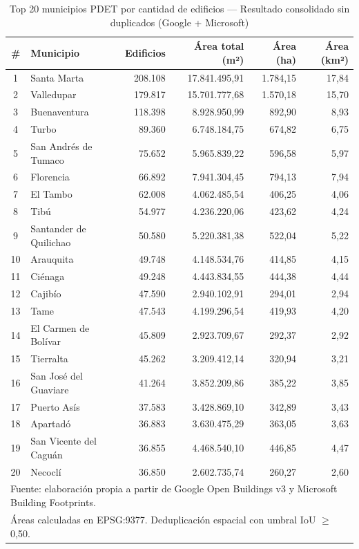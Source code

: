 \documentclass{article}
\begin{document}
\begin{table}[H]
\centering
\caption{Top 20 municipios PDET por cantidad de edificios --- Resultado consolidado 
sin duplicados (Google + Microsoft)}
\label{tab:top20_edificios}
\small
\begin{tabular}{clrrrr}
\toprule
\textbf{\#} & \textbf{Municipio} & \textbf{Edificios} & \textbf{Área total (m²)} & 
\textbf{Área (ha)} & \textbf{Área (km²)} \\
\midrule
1  & Santa Marta            & 208.108 & 17.841.495,91 & 1.784,15 & 17,84 \\
2  & Valledupar             & 179.817 & 15.701.777,68 & 1.570,18 & 15,70 \\
3  & Buenaventura           & 118.398 &  8.928.950,99 &   892,90 &  8,93 \\
4  & Turbo                  &  89.360 &  6.748.184,75 &   674,82 &  6,75 \\
5  & San Andrés de Tumaco   &  75.652 &  5.965.839,22 &   596,58 &  5,97 \\
6  & Florencia              &  66.892 &  7.941.304,45 &   794,13 &  7,94 \\
7  & El Tambo               &  62.008 &  4.062.485,54 &   406,25 &  4,06 \\
8  & Tibú                   &  54.977 &  4.236.220,06 &   423,62 &  4,24 \\
9  & Santander de Quilichao &  50.580 &  5.220.381,38 &   522,04 &  5,22 \\
10 & Arauquita              &  49.748 &  4.148.534,76 &   414,85 &  4,15 \\
11 & Ciénaga                &  49.248 &  4.443.834,55 &   444,38 &  4,44 \\
12 & Cajibío                &  47.590 &  2.940.102,91 &   294,01 &  2,94 \\
13 & Tame                   &  47.543 &  4.199.296,54 &   419,93 &  4,20 \\
14 & El Carmen de Bolívar   &  45.809 &  2.923.709,67 &   292,37 &  2,92 \\
15 & Tierralta              &  45.262 &  3.209.412,14 &   320,94 &  3,21 \\
16 & San José del Guaviare  &  41.264 &  3.852.209,86 &   385,22 &  3,85 \\
17 & Puerto Asís            &  37.583 &  3.428.869,10 &   342,89 &  3,43 \\
18 & Apartadó               &  36.883 &  3.630.475,29 &   363,05 &  3,63 \\
19 & San Vicente del Caguán &  36.855 &  4.468.540,10 &   446,85 &  4,47 \\
20 & Necoclí                &  36.850 &  2.602.735,74 &   260,27 &  2,60 \\
\bottomrule
\multicolumn{6}{l}{\footnotesize Fuente: elaboración propia a partir de Google Open 
Buildings v3 y Microsoft Building Footprints.} \\
\multicolumn{6}{l}{\footnotesize Áreas calculadas en EPSG:9377. Deduplicación 
espacial con umbral IoU $\geq$ 0,50.} \\
\end{tabular}
\end{table}
\end{document}
